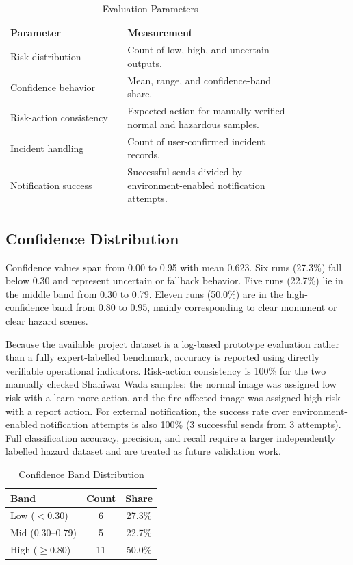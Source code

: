 \documentclass[10pt,conference]{IEEEtran}
\begin{document}
\begin{table}[h]
\caption{Evaluation Parameters}
\centering
\begin{tabular}{p{0.34\linewidth}p{0.50\linewidth}}
\toprule
\textbf{Parameter} & \textbf{Measurement} \\
\midrule
Risk distribution & Count of low, high, and uncertain outputs. \\
Confidence behavior & Mean, range, and confidence-band share. \\
Risk-action consistency & Expected action for manually verified normal and hazardous samples. \\
Incident handling & Count of user-confirmed incident records. \\
Notification success & Successful sends divided by environment-enabled notification attempts. \\
\bottomrule
\end{tabular}
\end{table}

\subsection{Confidence Distribution}
Confidence values span from 0.00 to 0.95 with mean 0.623. Six runs (27.3\%) fall below 0.30 and represent uncertain or fallback behavior. Five runs (22.7\%) lie in the middle band from 0.30 to 0.79. Eleven runs (50.0\%) are in the high-confidence band from 0.80 to 0.95, mainly corresponding to clear monument or clear hazard scenes.

Because the available project dataset is a log-based prototype evaluation rather than a fully expert-labelled benchmark, accuracy is reported using directly verifiable operational indicators. Risk-action consistency is 100\% for the two manually checked Shaniwar Wada samples: the normal image was assigned low risk with a learn-more action, and the fire-affected image was assigned high risk with a report action. For external notification, the success rate over environment-enabled notification attempts is also 100\% (3 successful sends from 3 attempts). Full classification accuracy, precision, and recall require a larger independently labelled hazard dataset and are treated as future validation work.

\begin{table}[h]
\caption{Confidence Band Distribution}
\centering
\begin{tabular}{lcc}
\toprule
\textbf{Band} & \textbf{Count} & \textbf{Share} \\
\midrule
Low ($<0.30$) & 6 & 27.3\% \\
Mid ($0.30$--$0.79$) & 5 & 22.7\% \\
High ($\geq0.80$) & 11 & 50.0\% \\
\bottomrule
\end{tabular}
\end{table}
\end{document}

